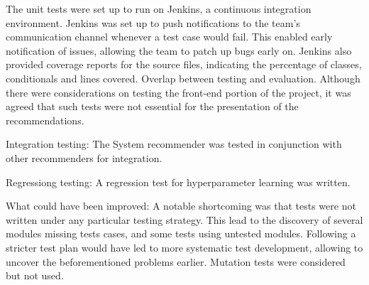 \documentclass{l3proj}
\begin{document}

The unit tests were set up to run on Jenkins, a continuous integration environment.
Jenkins was set up to push notifications to the team's communication channel whenever a test case would fail. This enabled early notification of issues, allowing the team to patch up bugs early on.
Jenkins also provided coverage reports for the source files, indicating the percentage of classes, conditionals and lines covered.
Overlap between testing and evaluation.
Although there were considerations on testing the front-end portion of the project, it was agreed that such tests were not essential for the presentation of the recommendations.

Integration testing:
The System recommender was tested in conjunction with other recommenders for integration.

Regressiong testing:
A regression test for hyperparameter learning was written.

What could have been improved:
A notable shortcoming was that tests were not written under any particular testing strategy. This lead to the discovery of several modules missing tests cases, and some tests using untested modules. Following a stricter test plan would have led to more systematic test development, allowing to uncover the beforementioned problems earlier.
Mutation tests were considered but not used.

\end{document}
